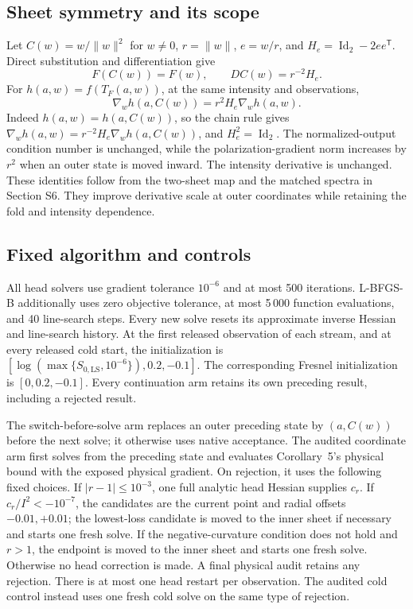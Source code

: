\documentclass[10pt,a4paper]{article}
\begin{document}
\subsection{Sheet symmetry and its scope}
Let $C(w)=w/\|w\|^2$ for $w\ne0$, $r=\|w\|$, $e=w/r$, and $H_e=\operatorname{Id}_2-2ee^{\mathsf T}$. Direct substitution and differentiation give
\begin{equation}
 F(C(w))=F(w),\qquad DC(w)=r^{-2}H_e.
 \label{eq:chartidentity}
\end{equation}
For $h(a,w)=f(T_F(a,w))$, at the same intensity and observations,
\begin{equation}
 \nabla_w h(a,C(w))=r^2H_e\nabla_w h(a,w).
 \label{eq:chartgradient}
\end{equation}
Indeed $h(a,w)=h(a,C(w))$, so the chain rule gives $\nabla_w h(a,w)=r^{-2}H_e\nabla_w h(a,C(w))$, and $H_e^2=\operatorname{Id}_2$. The normalized-output condition number is unchanged, while the polarization-gradient norm increases by $r^2$ when an outer state is moved inward. The intensity derivative is unchanged. These identities follow from the two-sheet map and the matched spectra in Section S6. They improve derivative scale at outer coordinates while retaining the fold and intensity dependence.

\subsection{Fixed algorithm and controls}
All head solvers use gradient tolerance $10^{-6}$ and at most 500 iterations. L-BFGS-B additionally uses zero objective tolerance, at most 5\,000 function evaluations, and 40 line-search steps. Every new solve resets its approximate inverse Hessian and line-search history. At the first released observation of each stream, and at every released cold start, the initialization is $[\log(\max\{S_{0,\mathrm{LS}},10^{-6}\}),0.2,-0.1]$. The corresponding Fresnel initialization is $[0,0.2,-0.1]$. Every continuation arm retains its own preceding result, including a rejected result.

The switch-before-solve arm replaces an outer preceding state by $(a,C(w))$ before the next solve; it otherwise uses native acceptance. The audited coordinate arm first solves from the preceding state and evaluates Corollary~5's physical bound with the exposed physical gradient. On rejection, it uses the following fixed choices. If $|r-1|\le10^{-3}$, one full analytic head Hessian supplies $c_r$. If $c_r/I^2<-10^{-7}$, the candidates are the current point and radial offsets $-0.01,+0.01$; the lowest-loss candidate is moved to the inner sheet if necessary and starts one fresh solve. If the negative-curvature condition does not hold and $r>1$, the endpoint is moved to the inner sheet and starts one fresh solve. Otherwise no head correction is made. A final physical audit retains any rejection. There is at most one head restart per observation. The audited cold control instead uses one fresh cold solve on the same type of rejection.
\end{document}
